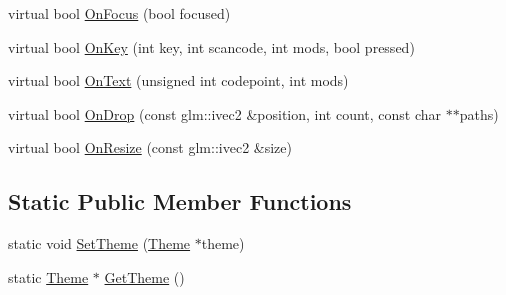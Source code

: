 \begin{DoxyCompactItemize}
\item 
virtual bool \mbox{\hyperlink{classngl__gui_1_1_widget_a3ea889d10cb2e1d0241dabbefdce5dc7}{On\+Focus}} (bool focused)
\item 
virtual bool \mbox{\hyperlink{classngl__gui_1_1_widget_a5e2315b912f87414def29b4bdbba9205}{On\+Key}} (int key, int scancode, int mods, bool pressed)
\item 
virtual bool \mbox{\hyperlink{classngl__gui_1_1_widget_ab991bcac876f5652190a81beece5f0f1}{On\+Text}} (unsigned int codepoint, int mods)
\item 
virtual bool \mbox{\hyperlink{classngl__gui_1_1_widget_a244384eb10f734be4bbd90b440817592}{On\+Drop}} (const glm\+::ivec2 \&position, int count, const char $\ast$$\ast$paths)
\item 
virtual bool \mbox{\hyperlink{classngl__gui_1_1_widget_ab360115cc08879ea3f9b301bdccc05ce}{On\+Resize}} (const glm\+::ivec2 \&size)
\end{DoxyCompactItemize}
\subsection*{Static Public Member Functions}
\begin{DoxyCompactItemize}
\item 
static void \mbox{\hyperlink{classngl__gui_1_1_widget_a89d5ed0cb6340f32524fdaca4721fb6a}{Set\+Theme}} (\mbox{\hyperlink{classngl__gui_1_1_theme}{Theme}} $\ast$theme)
\item 
static \mbox{\hyperlink{classngl__gui_1_1_theme}{Theme}} $\ast$ \mbox{\hyperlink{classngl__gui_1_1_widget_a4b78d39f4d5092bce3f2454ad1df3d9f}{Get\+Theme}} ()
\end{DoxyCompactItemize}
